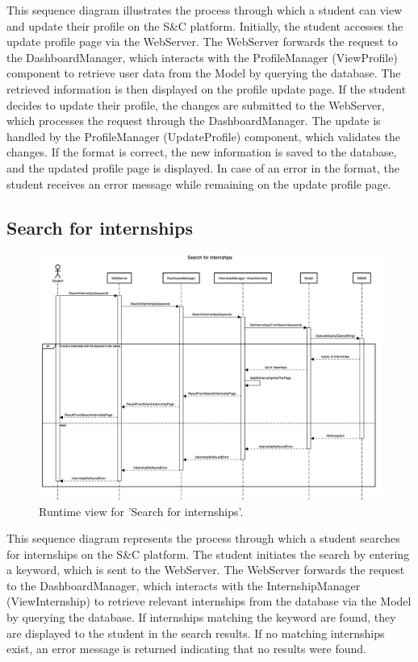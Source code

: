 This sequence diagram illustrates the process through which a student can view and update their profile on the S\&C platform. Initially, the student accesses the update profile page via the WebServer. The WebServer forwards the request to the DashboardManager, which interacts with the ProfileManager (ViewProfile) component to retrieve user data from the Model by querying the database. The retrieved information is then displayed on the profile update page. If the student decides to update their profile, the changes are submitted to the WebServer, which processes the request through the DashboardManager. The update is handled by the ProfileManager (UpdateProfile) component, which validates the changes. If the format is correct, the new information is saved to the database, and the updated profile page is displayed. In case of an error in the format, the student receives an error message while remaining on the update profile page.

\subsection{Search for internships}
\begin{figure}[H]
    \begin{center}
        \includegraphics[width=0.8\linewidth]{DD/LaTeX/Images/RuntimeView/SearchInternship.png}
        \caption{Runtime view for 'Search for internships'.}
        \label{fig:runtime_SearchInternship}%
    \end{center}
\end{figure}

This sequence diagram represents the process through which a student searches for internships on the S\&C platform. The student initiates the search by entering a keyword, which is sent to the WebServer. The WebServer forwards the request to the DashboardManager, which interacts with the InternshipManager (ViewInternship) to retrieve relevant internships from the database via the Model by querying the database. If internships matching the keyword are found, they are displayed to the student in the search results. If no matching internships exist, an error message is returned indicating that no results were found.

